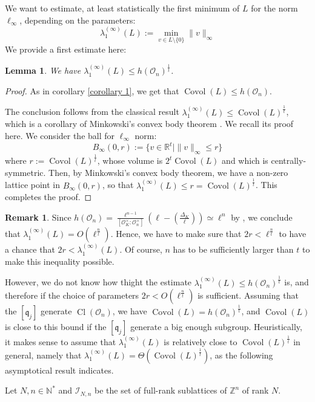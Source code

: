 \documentclass[a4paper,10pt]{report}
\theoremstyle{definition}
\theoremstyle{plain}
\newtheorem{lemma}[definition]{Lemma}
\theoremstyle{definition}
\newtheorem{remark}[definition]{Remark}
\newcommand{\N}{\mathbb{N}}
\newcommand{\Z}{\mathbb{Z}}
\newcommand{\R}{\mathbb{R}}
\newcommand{\m}[1]{\mathcal{#1}}
\newcommand{\mO}{\mathcal{O}}
\renewcommand{\(}{\left(}
\renewcommand{\)}{\right)}
\newcommand{\mf}[1]{\mathfrak{#1}}
\DeclareMathOperator{\Cl}{Cl}
\DeclareMathOperator{\Covol}{Covol}
\begin{document}
We want to estimate, at least statistically the first minimum of $L$ for the norm $\ell_\infty$, depending on the parameters:
\[\lambda_1^{(\infty)}(L):=\min_{v\in L\setminus\{0\}}\|v\|_\infty\]
We provide a first estimate here:

\begin{lemma}
We have $\lambda_1^{(\infty)}(L)\leq h(\mO_n)^{\frac{1}{t}}$.
\end{lemma}

\begin{proof}
As in corollary \ref{corollary 1}, we get that $\Covol(L)\leq h(\mO_n)$.

The conclusion follows from the classical result $\lambda_1^{(\infty)}(L)\leq \Covol(L)^{\frac{1}{t}}$, which is a corollary of Minkowski's convex body theorem \cite[theorem V.3]{Lang_ANT}. We recall its proof here. We consider the ball for $\ell_\infty$ norm:
\[B_\infty(0,r):=\{v\in\R^t\mid \|v\|_\infty\leq r\}\]
where $r:=\Covol(L)^{\frac{1}{t}}$, whose volume is $2^t\Covol(L)$ and which is centrally-symmetric. Then, by Minkowski's convex body theorem, we have a non-zero lattice point in $B_\infty(0,r)$, so that $\lambda_1^{(\infty)}(L)\leq r=\Covol(L)^{\frac{1}{t}}$. This completes the proof.
\end{proof}

\begin{remark}
Since $h(\mO_n)=\frac{\ell^{n-1}}{[\mO_K^\times:\mO_n^\times]}\(\ell-\(\frac{\Delta_K}{\ell}\)\)\simeq\ell^n$ by \cite[theorem 7.24]{Cox}, we conclude that $\lambda_1^{(\infty)}(L)=O(\ell^{\frac{n}{t}})$. Hence, we have to make sure that $2r<\ell^{\frac{n}{t}}$ to have a chance that $2r<\lambda_1^{(\infty)}(L)$.  Of course, $n$ has to be sufficiently larger than $t$ to make this inequality possible.

However, we do not know how thight the estimate $\lambda_1^{(\infty)}(L)\leq h(\mO_n)^{\frac{1}{t}}$ is, and therefore if the choice of parameters $2r<O(\ell^{\frac{n}{t}})$ is sufficient. Assuming that the $[\mf{q}_j]$ generate $\Cl(\mO_n)$, we have $\Covol(L)=h(\mO_n)^{\frac{1}{t}}$, and $\Covol(L)$ is close to this bound if the $[\mf{q}_j]$ generate a big enough subgroup. Heuristically, it makes sense to assume that $\lambda_1^{(\infty)}(L)$ is relatively close to $\Covol(L)^{\frac{1}{t}}$ in general, namely that $\lambda_1^{(\infty)}(L)=\Theta(\Covol(L)^{\frac{1}{t}})$, as the following asymptotical result indicates. 
\end{remark}

Let $N, n\in\N^*$ and $\m{I}_{N,n}$ be the set of full-rank sublattices of $\Z^n$ of rank $N$.
\end{document}
